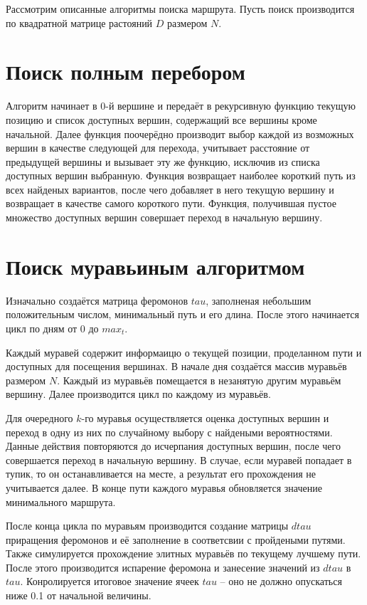 Рассмотрим описанные алгоритмы поиска маршрута. Пусть поиск производится по квадратной матрице растояний $D$ размером $N$.

\section{Поиск полным перебором}
Алгоритм начинает в 0-й вершине и передаёт в рекурсивную функцию текущую позицию и список доступных вершин, содержащий все вершины кроме начальной. Далее функция поочерёдно производит выбор каждой из возможных вершин в качестве следующей для перехода, учитывает расстояние от предыдущей вершины и вызывает эту же функцию, исключив из списка доступных вершин выбранную. Функция возвращает наиболее короткий путь из всех найденых вариантов, после чего добавляет в него текущую вершину и возвращает в качестве самого короткого пути. Функция, получившая пустое множество доступных вершин совершает переход в начальную вершину.


\section{Поиск муравьиным алгоритмом}
Изначально создаётся матрица феромонов $tau$, заполненая небольшим положительным числом, минимальный путь и его длина. После этого начинается цикл по дням от 0 до $max_t$.

Каждый муравей содержит информаицю о текущей позиции, проделанном пути и доступных для посещения вершинах. В начале дня создаётся массив муравьёв размером $N$. Каждый из муравьёв помещается в незанятую другим муравьём вершину. Далее производится цикл по каждому из муравьёв.

Для очередного $k$-го муравья осуществляется оценка доступных вершин и переход в одну из них по случайному выбору с найдеными вероятностями. Данные действия повторяются до исчерпания доступных вершин, после чего совершается переход в начальную вершину. В случае, если муравей попадает в тупик, то он останавливается на месте, а результат его прохождения не учитывается далее. В конце пути каждого муравья обновляется значение минимального маршрута.

После конца цикла по муравьям производится создание матрицы $dtau$ приращения феромонов и её заполнение в соответсвии с пройдеными путями. Также симулируется прохождение элитных муравьёв по текущему лучшему пути. После этого производится испарение феромона и занесение значений из $dtau$ в $tau$. Конролируется итоговое значение ячеек $tau$ -- оно не должно опускаться ниже 0.1 от начальной величины.


